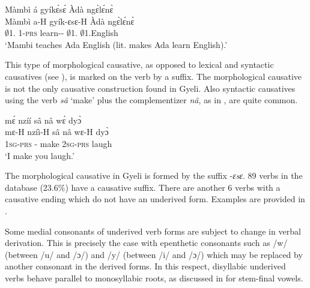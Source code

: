 \ea \label{Causdef}
 \glll Màmbì á gyíkɛ́sɛ́ Àdà ngɛ̀lɛ́nɛ̀  \\
	Màmbì a-H gyík-ɛsɛ-H Àdà ngɛ̀lɛ́nɛ̀ \\
         $\emptyset$1.{\PN} 1-\textsc{prs} learn-{\CAUS}-{\R} $\emptyset$1.{\PN} $\emptyset$1.English  \\
    \trans `Mambi teaches Ada English (lit. makes Ada learn English).'
\z

This type of morphological causative, as opposed to lexical and syntactic causatives (see \citealt[3]{song96}), is marked on the verb by a suffix. The morphological causative is not the only causative construction found in Gyeli. Also syntactic causatives using the verb {\itshape sâ} `make' plus the complementizer {\itshape nâ}, as in , are quite common.

\ea \label{CAUS1}
  \glll     mɛ́ nzíí sâ nâ wɛ́ dyɔ̀\\
	mɛ-H nzíì-H sâ nâ wɛ-H dyɔ̀ \\
              1\textsc{sg}-\textsc{prs} {\PROG}-{\R} make {\COMP} 2\textsc{sg}-\textsc{prs} laugh  \\
    \trans `I make you laugh.'
\z

The morphological causative in Gyeli is formed by the suffix -{\itshape ɛsɛ}. 89 verbs in the database (23.6\%) have a causative suffix. There are another 6 verbs with a causative ending which do not  have an underived form. Examples are provided in .


Some medial consonants of underived verb forms are subject to change in verbal derivation. This is precisely the case with epenthetic consonants such as /w/ (between /u/ and /ɔ/) and /y/ (between /i/ and /ɔ/) which may be replaced by another consonant in the derived forms. In this respect, disyllabic underived verbs behave parallel to monosyllabic roots, as discussed in  for stem-final vowels.


